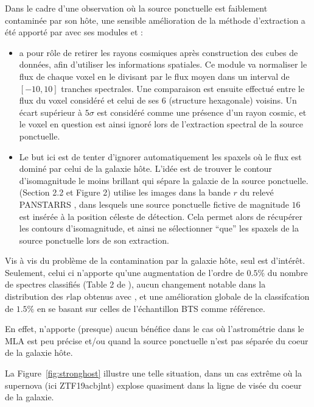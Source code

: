 \documentclass[../main/main.tex]{subfiles}
\begin{document}
Dans le cadre d'une observation où la source ponctuelle est faiblement
contaminée par son hôte, une sensible amélioration
de la méthode d'extraction a été apporté par \citet{Kimcontsep} avec ses
modules  et :

\begin{itemize}[label=$\bullet$]
\itemsep0em 
\item \textbf{} a pour rôle de retirer
les rayons cosmiques après construction des cubes de données, afin
d'utiliser les informations spatiales. Ce module va
normaliser le flux de chaque voxel en le divisant par le flux moyen dans
un interval de $[-10,10]$ tranches spectrales. Une
comparaison est ensuite effectué entre le flux du voxel considéré  et celui de ses $6$
(structure hexagonale)
voisins. Un écart supérieur à $5\sigma$ est considéré comme une présence
d'un rayon cosmic, et le voxel en question est ainsi ignoré lors de
l'extraction spectral de la source ponctuelle.
\item \textbf{} Le but ici est de tenter d'ignorer
  automatiquement les spaxels où le flux est dominé par celui de la
  galaxie hôte. L'idée est de trouver le contour d'isomagnitude le moins
  brillant qui sépare la galaxie de la source
  ponctuelle. \citet{Kimcontsep} (Section 2.2 et Figure 2) utilise les images dans
  la bande $r$ du relevé PANSTARRS \citep{ChambersPanstarrs}, dans
  lesquels une source ponctuelle fictive de magnitude $16$ est insérée à
  la position céleste de détection. Cela permet alors de récupérer les
  contours d'isomagnitude, et ainsi ne sélectionner ``que'' les spaxels
  de la source ponctuelle lors de son extraction.
\end{itemize}

Vis à vis du problème de la contamination par la galaxie hôte, seul 
est d'intérêt. Seulement, celui ci n'apporte qu'une augmentation de
l'ordre de $0.5\%$ du nombre de spectres classifiés (Table 2 de
\citet{Kimcontsep}), aucun changement notable dans la distribution des
$r\text{lap}$ obtenus avec , et une amélioration globale de la
classifcation de $1.5\%$ en se basant sur celles de l'échantillon BTS comme référence.

En effet,  n'apporte (presque) aucun bénéfice dans le cas où
l'astrométrie dans le MLA est peu précise et/ou quand la source ponctuelle n'est pas
séparée du coeur de la galaxie hôte.

La Figure~\ref{fig:stronghost} illustre une telle situation, dans un cas
extrême où la supernova (ici ZTF19acbjlnt) explose quasiment dans la ligne de visée du
coeur de la galaxie.
\end{document}
